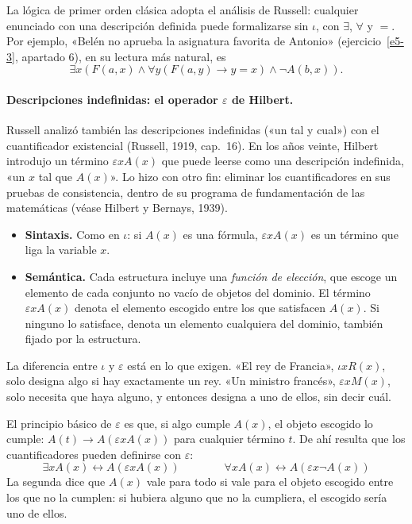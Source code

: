 La lógica de primer orden clásica adopta el análisis de Russell: cualquier enunciado con una descripción definida puede formalizarse sin $\iota$, con $\exists$, $\forall$ y $=$. Por ejemplo, «Belén no aprueba la asignatura favorita de Antonio» (ejercicio~\ref{e5-3}, apartado 6), en su lectura más natural, es
\[
\exists x (F(a, x) \land \forall y (F(a, y) \to y = x) \land \neg A(b, x)).
\]

\paragraph{Descripciones indefinidas: el operador $\varepsilon$ de
  Hilbert.} Russell analizó también las descripciones indefinidas («un
tal y cual») con el cuantificador existencial (Russell, 1919, cap.~16). En los años veinte, Hilbert introdujo un término $\varepsilon x A(x)$ que puede leerse como una descripción indefinida, «un $x$ tal que $A(x)$». Lo hizo con otro fin: eliminar los cuantificadores en sus pruebas de consistencia, dentro de su programa de fundamentación de las matemáticas (véase Hilbert y Bernays, 1939).
\begin{itemize}
    \item \textbf{Sintaxis.} Como en $\iota$: si $A(x)$ es una fórmula, $\varepsilon x A(x)$ es un término que liga la variable $x$.
    \item \textbf{Semántica.} Cada estructura incluye una \emph{función de elección}, que escoge un elemento de cada conjunto no vacío de objetos del dominio. El término $\varepsilon x A(x)$ denota el elemento escogido entre los que satisfacen $A(x)$. Si ninguno lo satisface, denota un elemento cualquiera del dominio, también fijado por la estructura.
\end{itemize}
La diferencia entre $\iota$ y $\varepsilon$ está en lo que exigen. «El rey de Francia», $\iota x R(x)$, solo designa algo si hay exactamente un rey. «Un ministro francés», $\varepsilon x M(x)$, solo necesita que haya alguno, y entonces designa a uno de ellos, sin decir cuál.

El principio básico de $\varepsilon$ es que, si algo cumple $A(x)$, el objeto escogido lo cumple: $A(t) \to A(\varepsilon x A(x))$ para cualquier término $t$. De ahí resulta que los cuantificadores pueden definirse con $\varepsilon$:
\[
\exists x A(x) \leftrightarrow A(\varepsilon x A(x)) \qquad\qquad \forall x A(x) \leftrightarrow A(\varepsilon x \neg A(x))
\]
La segunda dice que $A(x)$ vale para todo si vale para el objeto escogido entre los que no la cumplen: si hubiera alguno que no la cumpliera, el escogido sería uno de ellos.

